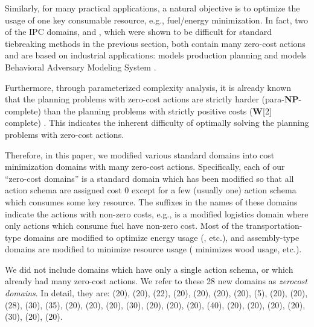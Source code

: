 Similarly, for many practical applications, a natural objective is to
optimize the usage of one key consumable resource, e.g., fuel/energy
minimization.  In fact, two of the IPC domains,  and
, which were shown to be difficult for standard tiebreaking
methods in the previous section, both contain many zero-cost actions
and are based on industrial applications: %
 models
production planning \cite{fink1999applications} and 
models Behavioral Adversary Modeling System \cite[minimizing decryption,
data transfer, etc.]{boddy2005course}.

Furthermore, through parameterized complexity analysis, it is already known that the planning problems with
zero-cost actions are strictly harder (para-\textbf{NP}-complete) than the planning problems with strictly positive
costs (\textbf{W}[2] complete) \cite{aghighi2015}. This indicates the inherent difficulty of optimally solving the
planning problems with zero-cost actions.

Therefore, in this paper, we modified various standard domains
into cost minimization domains with many zero-cost actions.
Specifically, each of our ``zero-cost domains'' is a standard domain which has been modified so that all action schema are assigned
cost 0 except for a few (usually one) action schema which consumes some key resource.
The suffixes in the names of these domains indicate the actions with non-zero costs, 
e.g.,  is a modified logistics domain where only actions which consume fuel have non-zero cost.
Most of the transportation-type domains are modified to optimize 
energy usage (,  etc.), and  assembly-type domains are modified to minimize resource usage
( minimizes wood usage, etc.).

We did not
include domains which have only a single action schema, or which already had many zero-cost actions.
We refer to these 28 new domains as \emph{zerocost domains}.
In detail, they are:
 (20),  (20),  (22),  (20),
 (20),  (20),  (20),  (5),
 (20),  (20),  (28),  (30),
 (35),  (20),  (20),
 (20),  (30),  (20),
 (20),  (20),  (40),
 (20),  (20),  (20),
 (20),  (30),  (20),
 (20).

